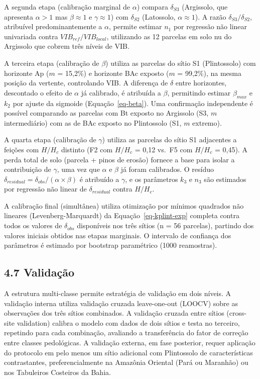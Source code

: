 \documentclass[
  brazilian,
  authoryear,
  preprint]{elsarticle}
\begin{document}
A segunda etapa (calibração marginal de \(\alpha\)) compara
\(\delta_{S3}\) (Argissolo, que apresenta \(\alpha > 1\) mas
\(\beta \approx 1\) e \(\gamma \approx 1\)) com \(\delta_{S2}\)
(Latossolo, \(\alpha \approx 1\)). A razão \(\delta_{S3}/\delta_{S2}\),
atribuível predominantemente a \(\alpha\), permite estimar \(n_1\) por
regressão não linear univariada contra \(VIB_{ref}/VIB_{local}\),
utilizando as 12 parcelas em solo nu do Argissolo que cobrem três níveis
de VIB.

A terceira etapa (calibração de \(\beta\)) utiliza as parcelas do sítio
S1 (Plintossolo) com horizonte Ap (\(m\) = 15,2\%) e horizonte BAc
exposto (\(m\) = 99,2\%), na mesma posição da vertente, controlando VIB.
A diferença de \(\delta\) entre horizontes, descontado o efeito de
\(\alpha\) já calibrado, é atribuída a \(\beta\), permitindo estimar
\(\beta_{max}\) e \(k_2\) por ajuste da sigmoide
(Equação~\ref{eq-beta}). Uma confirmação independente é possível
comparando as parcelas com Bt exposto no Argissolo (S3, \(m\)
intermediário) com as de BAc exposto no Plintossolo (S1, \(m\) extremo).

A quarta etapa (calibração de \(\gamma\)) utiliza as parcelas do sítio
S1 adjacentes a feições com \(H/H_c\) distinto (F2 com \(H/H_c\) = 0,12
vs.~F5 com \(H/H_c\) = 0,45). A perda total de solo (parcela + pinos de
erosão) fornece a base para isolar a contribuição de \(\gamma\), uma vez
que \(\alpha\) e \(\beta\) já foram calibrados. O resíduo
\(\delta_{residual} = \delta_{obs} / (\alpha \times \beta)\) é atribuído
a \(\gamma\), e os parâmetros \(k_3\) e \(n_3\) são estimados por
regressão não linear de \(\delta_{residual}\) contra \(H/H_c\).

A calibração final (simultânea) utiliza otimização por mínimos quadrados
não lineares (Levenberg-Marquardt) da Equação~\ref{eq-kplint-exp}
completa contra todos os valores de \(\delta_{obs}\) disponíveis nos
três sítios (n = 56 parcelas), partindo dos valores iniciais obtidos nas
etapas marginais. O intervalo de confiança dos parâmetros é estimado por
bootstrap paramétrico (1000 reamostras).

\subsection{4.7 Validação}\label{validauxe7uxe3o}

A estrutura multi-classe permite estratégia de validação em dois níveis.
A validação interna utiliza validação cruzada leave-one-out (LOOCV)
sobre as observações dos três sítios combinados. A validação cruzada
entre sítios (cross-site validation) calibra o modelo com dados de dois
sítios e testa no terceiro, repetindo para cada combinação, avaliando a
transferência do fator de correção entre classes pedológicas. A
validação externa, em fase posterior, requer aplicação do protocolo em
pelo menos um sítio adicional com Plintossolo de características
contrastantes, preferencialmente na Amazônia Oriental (Pará ou Maranhão)
ou nos Tabuleiros Costeiros da Bahia.
\end{document}
